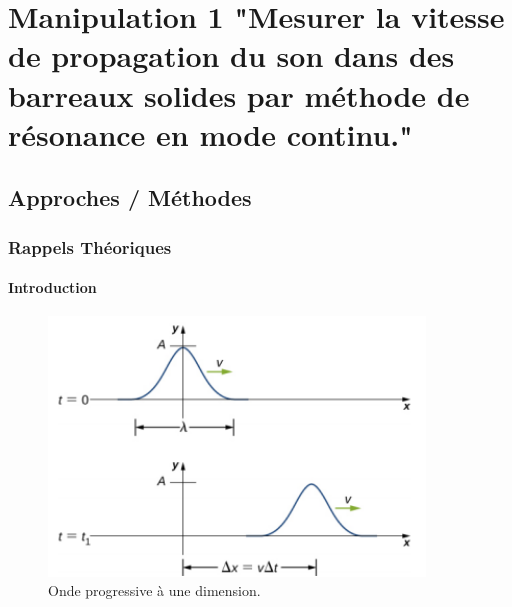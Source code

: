 \section{Manipulation 1 "Mesurer la vitesse de propagation du son dans des
barreaux solides par méthode de résonance en mode continu."}
\subsection{\large Approches / Méthodes}
\subsubsection{\large Rappels Théoriques}

\paragraph{Introduction}

\begin{figure}[h]
    \centering
    \includegraphics[width=10cm]{png/onde.png}
    \caption{Onde progressive à une dimension.~\cite{image-onde-progressive}}
\end{figure}

